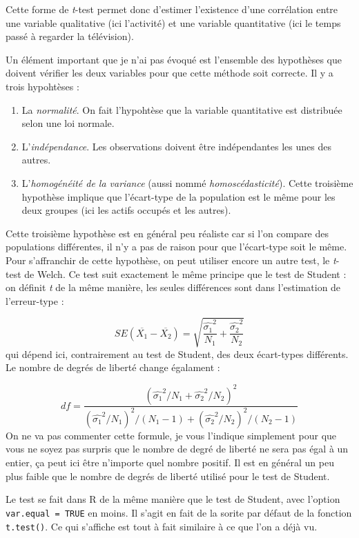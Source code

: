 \documentclass[
  french,
]{book}
\providecommand{\tightlist}{%
  \setlength{\itemsep}{0pt}\setlength{\parskip}{0pt}}
\begin{document}
Cette forme de \emph{t}-test permet donc d'estimer l'existence d'une corrélation entre une variable qualitative (ici l'activité) et une variable quantitative (ici le temps passé à regarder la télévision).

Un élément important que je n'ai pas évoqué est l'ensemble des hypothèses que doivent vérifier les deux variables pour que cette méthode soit correcte. Il y a trois hypohtèses :

\begin{enumerate}
\def\labelenumi{\arabic{enumi}.}
\tightlist
\item
  La \emph{normalité}. On fait l'hypohtèse que la variable quantitative est distribuée selon une loi normale.
\item
  L'\emph{indépendance}. Les observations doivent être indépendantes les unes des autres.
\item
  L'\emph{homogénéité de la variance} (aussi nommé \emph{homoscédasticité}). Cette troisième hypothèse implique que l'écart-type de la population est le même pour les deux groupes (ici les actifs occupés et les autres).
\end{enumerate}

Cette troisième hypothèse est en général peu réaliste car si l'on compare des populations différentes, il n'y a pas de raison pour que l'écart-type soit le même. Pour s'affranchir de cette hypothèse, on peut utiliser encore un autre test, le \emph{t}-test de Welch. Ce test suit exactement le même principe que le test de Student : on définit \emph{t} de la même manière, les seules différences sont dans l'estimation de l'erreur-type :

\[ SE(\overline{X_1} - \overline{X_2}) = \sqrt{\frac{\hat{\sigma_1}^2}{N_1} + \frac{\hat{\sigma_2}^2}{N_2}} \]
qui dépend ici, contrairement au test de Student, des deux écart-types différents. Le nombre de degrés de liberté change égalament :

\[ df = \frac{(\hat{\sigma_1}^2/N_1 + \hat{\sigma_2}^2/N_2)^2}{(\hat{\sigma_1}^2/N_1)^2/(N_1-1) + (\hat{\sigma_2}^2/N_2)^2/(N_2-1)}\]
On ne va pas commenter cette formule, je vous l'indique simplement pour que vous ne soyez pas surpris que le nombre de degré de liberté ne sera pas égal à un entier, ça peut ici être n'importe quel nombre positif. Il est en général un peu plus faible que le nombre de degrés de liberté utilisé pour le test de Student.

Le test se fait dans R de la même manière que le test de Student, avec l'option \texttt{var.equal\ =\ TRUE} en moins. Il s'agit en fait de la sorite par défaut de la fonction \texttt{t.test()}. Ce qui s'affiche est tout à fait similaire à ce que l'on a déjà vu.
\end{document}

